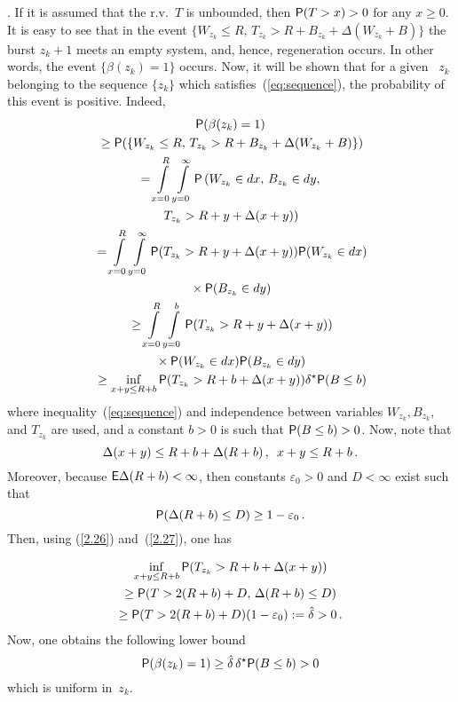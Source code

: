 \begin{multicols}{2}
. If it is assumed that the r.v.~$T$ is unbounded, then ${\sf P}(T>x)>0$ for any
$x\ge0$. It is easy to see that in the event 
$
\{W_{z_{k}}\le R,\, T_{z_{k}}>R+B_{z_{k}}+\Delta(W_{z_k} + B)\}
$
the burst $z_{k}+1$ meets an empty system, and, hence,  regeneration occurs.
 In other words, the event $\{\beta(z_{k})=1\}$ occurs.
Now, it will be shown that for a given~ $z_{k}$ belonging to the sequence $\{z_{k}\}$ which 
satisfies~(\ref{eq:sequence}), the probability of this event is positive. Indeed,
\begin{multline*}
{\sf P}(\beta(z_{k})=1)\\
{}\ge {\sf P}(\{W_{z_{k}}\le R,\,
T_{z_{k}}>R+B_{z_{k}}+\Delta(W_{z_k} + B)\}) \\
{} =  \int\limits_{x = 0}^{R} \int\limits_{y = 0}^{\infty} {\sf P}\left(W_{z_k} \in dx,\, 
B_{z_k} \in dy,\right.\\
\left. T_{z_k} > R + y + \Delta(x+y) \right) \\
{}  =   \int\limits_{x = 0}^{R} \int\limits_{y = 0}^{\infty} {\sf P}(T_{z_k} > R + y + \Delta(x+y) ) 
{\sf P}(W_{z_k} \in dx) \\
{}\times {\sf P}(B_{z_k} \in dy)\\
{} \ge  \int\limits_{x = 0}^{R} \int\limits_{y = 0}^{b} {\sf P}(T_{z_k} > R + y + 
\Delta(x+y) )\\
{}\times {\sf P}(W_{z_k} \in dx) {\sf P}(B_{z_k} \in dy)
\\
 {}\ge \inf\limits_{x+y \le R+b} {\sf P}(T_{z_k} >
 R + b + \Delta(x+y) )
\delta^\star {\sf P}(B \le b) 
\end{multline*}
where inequality~(\ref{eq:sequence}) and independence between variables 
$W_{z_{k}}, B_{z_{k}}$, and $T_{z_{k}}$ are used, and a constant $b>0$ is such  
that ${\sf P}(B\le b)>0$. Now, note that
\begin{equation}
\Delta(x+y) \le R+b+\Delta(R+b)\,,\enskip x+y \le  R+b\,. 
\label{2.26}
\end{equation}
Moreover, because ${\sf E} \Delta(R+b)<\infty$, then constants
$\varepsilon_0>0$ and $D<\infty$ exist such that
\begin{equation}
{\sf P}(\Delta(R+b)\le D)\ge 1- \varepsilon_0\,. 
\label{2.27}
\end{equation}
Then, using (\ref{2.26}) and~(\ref{2.27}), one has

\noindent
\begin{multline*}
\inf_{x+y \le R+b} {\sf P}(T_{z_k} >
 R + b + \Delta(x+y) )\\
 \ge 
 {\sf P}(T> 2(R + b) +D,\, \Delta(R+b)\le D)\\
\ge {\sf P}(T > 2(R +
 b)+D)(1- \varepsilon_0):=\hat \delta>0\,.
\end{multline*}
Now, one obtains the following lower bound
\begin{equation*}
{\sf P}(\beta(z_{k})=1)\ge \hat \delta \,\delta^\star {\sf P}(B \le b)>0
\end{equation*}
which is uniform  in~$z_k$.


\end{multicols}
